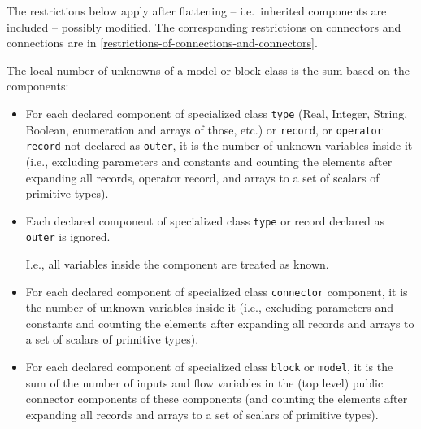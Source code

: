 The restrictions below apply after flattening -- i.e.\ inherited components are included -- possibly modified.  The corresponding restrictions on connectors and connections are in
\cref{restrictions-of-connections-and-connectors}.

\begin{definition}
The local number of unknowns of a model or block class is the sum based on the components:
\begin{itemize}
\item
  For each declared component of specialized class \lstinline!type! (Real, Integer,
  String, Boolean, enumeration and arrays of those, etc.) or \lstinline!record!, or
  \lstinline!operator record! not declared as \lstinline!outer!, it is the number of unknown
  variables inside it (i.e., excluding parameters and constants and
  counting the elements after expanding all records, operator record,
  and arrays to a set of scalars of primitive types).
\item
  Each declared component of specialized class \lstinline!type! or record declared
  as \lstinline!outer! is ignored.
  \begin{nonnormative}
  I.e., all variables inside the component are treated as known.
  \end{nonnormative}
\item
  For each declared component of specialized class \lstinline!connector! component,
  it is the number of unknown variables inside it (i.e., excluding
  parameters and constants and counting the elements after expanding all
  records and arrays to a set of scalars of primitive types).
\item
  For each declared component of specialized class \lstinline!block! or \lstinline!model!, it is
  the sum of the number of inputs and flow variables in the (top
  level) public connector components of these components (and counting
  the elements after expanding all records and arrays to a set of
  scalars of primitive types).
\end{itemize}
\end{definition}


